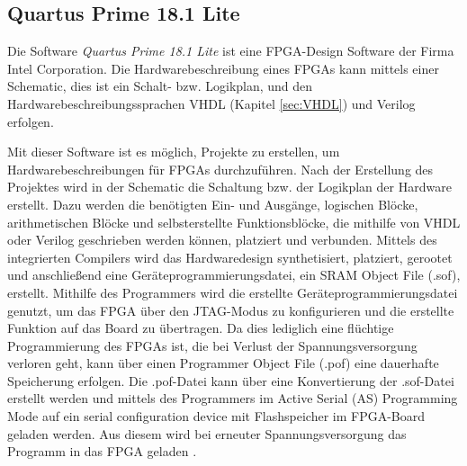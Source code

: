 \documentclass[ngerman,12pt]{article} %
\begin{document}
\subsection{Quartus Prime 18.1 Lite}
\label{sec:Quartus Prime 18.1 Lite}
Die Software \textit{Quartus Prime 18.1 Lite} ist eine FPGA-Design Software der Firma Intel Corporation. Die Hardwarebeschreibung eines FPGAs kann mittels einer Schematic, dies ist ein Schalt- bzw. Logikplan, und den Hardwarebeschreibungssprachen VHDL (Kapitel \ref {sec:VHDL}) und Verilog erfolgen.\newline

Mit dieser Software ist es möglich, Projekte zu erstellen, um Hardwarebeschreibungen für FPGAs durchzuführen. Nach der Erstellung des Projektes wird in der Schematic die Schaltung bzw. der Logikplan der Hardware erstellt. Dazu werden die benötigten Ein- und Ausgänge, logischen Blöcke, arithmetischen Blöcke und selbsterstellte Funktionsblöcke, die mithilfe von VHDL oder Verilog geschrieben werden können, platziert und verbunden. Mittels des integrierten Compilers wird das Hardwaredesign synthetisiert, platziert, gerootet und anschließend eine Geräteprogrammierungsdatei, ein SRAM Object File (.sof), erstellt. Mithilfe des Programmers wird die erstellte Geräteprogrammierungsdatei genutzt, um das FPGA über den JTAG-Modus zu konfigurieren und die erstellte Funktion auf das Board zu übertragen. Da dies lediglich eine flüchtige Programmierung des FPGAs ist, die bei Verlust der Spannungsversorgung verloren geht, kann über einen Programmer Object File (.pof) eine dauerhafte Speicherung erfolgen. Die .pof-Datei kann über eine Konvertierung der .sof-Datei erstellt werden und mittels des Programmers im Active Serial (AS) Programming Mode auf ein serial configuration device mit Flashspeicher im FPGA-Board geladen werden. Aus diesem wird bei erneuter Spannungsversorgung das Programm in das FPGA geladen \cite{Intel}.%
\end{document}
